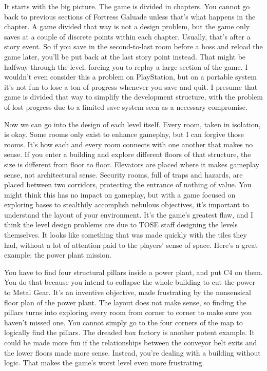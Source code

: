 \documentclass{book}
\begin{document}
It starts with the big picture. The game is divided in chapters. You cannot go back to previous sections of Fortress Galuade unless that’s what happens in the chapter. A game divided that way is not a design problem, but the game only saves at a couple of discrete points within each chapter. Usually, that’s after a story event. So if you save in the second-to-last room before a boss and reload the game later, you’ll be put back at the last story point instead. That might be halfway through the level, forcing you to replay a large section of the game. I wouldn’t even consider this a problem on PlayStation, but on a portable system it’s not fun to lose a ton of progress whenever you save and quit. I presume that game is divided that way to simplify the development structure, with the problem of lost progress due to a limited save system seen as a necessary compromise.

Now we can go into the design of each level itself. Every room, taken in isolation, is okay. Some rooms only exist to enhance gameplay, but I can forgive those rooms. It’s how each and every room connects with one another that makes no sense. If you enter a building and explore different floors of that structure, the size is different from floor to floor. Elevators are placed where it makes gameplay sense, not architectural sense. Security rooms, full of traps and hazards, are placed between two corridors, protecting the entrance of nothing of value. You might think this has no impact on gameplay, but with a game focused on exploring bases to stealthily accomplish nebulous objectives, it’s important to understand the layout of your environment. It’s the game’s greatest flaw, and I think the level design problems are due to TOSE staff designing the levels themselves. It looks like something that was made quickly with the tiles they had, without a lot of attention paid to the players’ sense of space. Here’s a great example: the power plant mission.

You have to find four structural pillars inside a power plant, and put C4 on them. You do that because you intend to collapse the whole building to cut the power to Metal Gear. It’s an inventive objective, made frustrating by the nonsensical floor plan of the power plant. The layout does not make sense, so finding the pillars turns into exploring every room from corner to corner to make sure you haven’t missed one. You cannot simply go to the four corners of the map to logically find the pillars. The dreaded box factory is another potent example. It could be made more fun if the relationships between the conveyor belt exits and the lower floors made more sense. Instead, you’re dealing with a building without logic. That makes the game’s worst level even more frustrating.
\end{document}
